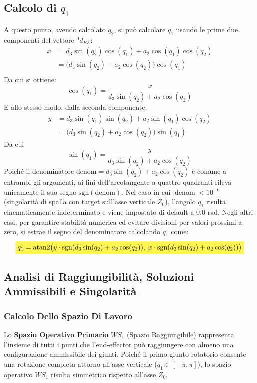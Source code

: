 ﻿\documentclass[11pt, a4paper]{article}
\begin{document}
\subsection*{Calcolo di $q_1$}
A questo punto, avendo calcolato $q_{2}$, si può calcolare $q_{1}$ usando le prime due componenti del vettore ${}^{0}d_{EE}$:
\begin{align*}
    x &= d_3 \sin(q_2) \cos(q_1) + a_2 \cos(q_1) \cos(q_2)\\
    & = \biggl(d_3 \sin(q_2) + a_2 \cos(q_2)\biggr) \cos(q_1)\\
\end{align*}
Da cui si ottiene:
\[
    \boxed{
        \cos(q_1) = \frac{x}{d_3 \sin(q_2) + a_2 \cos(q_2)}
    }
\]
E allo stesso modo, dalla seconda componente:
\begin{align*}
    y &= d_3 \sin(q_1) \sin(q_2) + a_2 \sin(q_1) \cos(q_2)\\
    &= \biggl(d_3 \sin(q_2) + a_2 \cos(q_2)\biggr) \sin(q_1)
\end{align*}
Da cui
\[
    \boxed{
        \sin(q_1) = \frac{y}{d_3 \sin(q_2) + a_2 \cos(q_2)}
    }
\]
Poiché il denominatore $\text{denom} = d_3 \sin(q_2) + a_2 \cos(q_2)$ è comune a entrambi gli argomenti, ai fini dell'arcotangente a quattro quadranti rileva unicamente il suo segno $\text{sgn}(\text{denom})$. Nel caso in cui $|\text{denom}| < 10^{-6}$ (singolarità di spalla con target sull'asse verticale $Z_0$), l'angolo $q_1$ risulta cinematicamente indeterminato e viene impostato di default a $0.0\text{ rad}$. Negli altri casi, per garantire stabilità numerica ed evitare divisioni per valori prossimi a zero, si estrae il segno del denominatore calcolando $q_1$ come:
\[
    \colorbox{customYellow}{$\displaystyle
        q_1 = \text{atan2}\bigl(y \cdot \text{sgn}(d_3 \sin(q_2) + a_2 \cos(q_2)), \; x \cdot \text{sgn}(d_3 \sin(q_2) + a_2 \cos(q_2))\bigr)
    $}
\]

\subsection*{Analisi di Raggiungibilità, Soluzioni Ammissibili e Singolarità}

\subsubsection*{Calcolo Dello Spazio Di Lavoro}

Lo \textbf{Spazio Operativo Primario} $WS_{1}$ (Spazio Raggiungibile) rappresenta l'insieme di tutti i punti che l'end-effector può raggiungere con almeno una configurazione ammissibile dei giunti. Poiché il primo giunto rotatorio consente una rotazione completa attorno all'asse verticale ($q_1 \in [-\pi, \pi]$), lo spazio operativo $WS_{1}$ risulta simmetrico rispetto all'asse $Z_0$.
\end{document}
